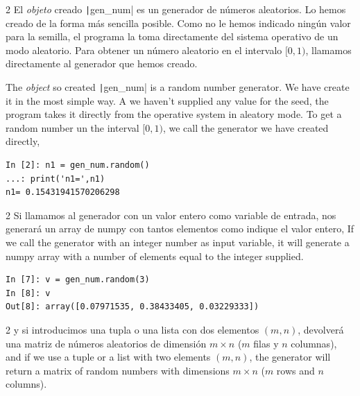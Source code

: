 \begin{paracol}{2}
El  \emph{objeto} creado \texttt|gen_num| es un generador de números aleatorios. Lo hemos creado de la forma más sencilla posible. Como no le hemos indicado ningún valor para la semilla, el programa la toma directamente del sistema operativo de un modo aleatorio. Para obtener un número aleatorio en el intervalo $[0,1)$, llamamos directamente al generador que hemos creado.

\switchcolumn
The \emph{object} so created \texttt|gen_num| is a random number generator. We have create it in the most simple way. A we haven't supplied any value for the seed, the program takes it directly from the operative system in aleatory mode. To get a random number un the interval $[0,1)$, we call the generator we have created directly, 

\end{paracol}
\begin{center}
	\begin{minipage}{0.5\textwidth}
\begin{verbatim}
In [2]: n1 = gen_num.random()
...: print('n1=',n1)
n1= 0.15431941570206298
\end{verbatim}
\end{minipage}
\end{center}
\begin{paracol}{2}
Si llamamos al generador con un valor entero como variable de entrada, nos generará un array de numpy con tantos elementos como indique el valor entero,
\switchcolumn
If we call the generator with an integer number as input variable, it will generate a numpy array with a number of elements equal to the integer supplied.
\end{paracol}
\begin{center}
	\begin{minipage}{0.5\textwidth}
\begin{verbatim}
In [7]: v = gen_num.random(3)
In [8]: v
Out[8]: array([0.07971535, 0.38433405, 0.03229333])
\end{verbatim}
\end{minipage}
\end{center}

\begin{paracol}{2}
\noindent y si introducimos una tupla o una lista con dos elementos $(m,n)$, devolverá una matriz de números aleatorios de dimensión $m\times n$ ($m$ filas y $n$ columnas),
\switchcolumn
\noindent and if we use a tuple or a list with two elements $(m,n)$, the generator will return a matrix of random numbers with dimensions $m\times n$ ($m$ rows and $n$ columns).
\end{paracol}

